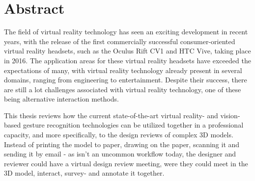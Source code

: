 \chapter*{Abstract}       
The field of virtual reality technology has seen an exciting development in recent years, 
with the release of the first commercially successful consumer-oriented virtual reality headsets, such as the Oculus Rift CV1 and HTC Vive, taking place in 2016.
The application areas for these virtual reality headsets have exceeded the expectations of many, with virtual reality
technology already present in several domains, ranging from engineering to entertainment.
Despite their success, there are still a lot challenges associated with virtual reality technology, one of these being alternative interaction methods.


This thesis reviews how the current state-of-the-art virtual reality- and vision-based gesture recognition technologies can be utilized together in a
professional capacity, and more specifically, to the design reviews of complex 3D models.
Instead of printing the model to paper, drawing on the paper, scanning it and sending it by email - as isn't an uncommon workflow today, 
the designer and reviewer could have a virtual design review meeting, were they could meet in the 3D model, interact, survey- and annotate it together. 



% 

